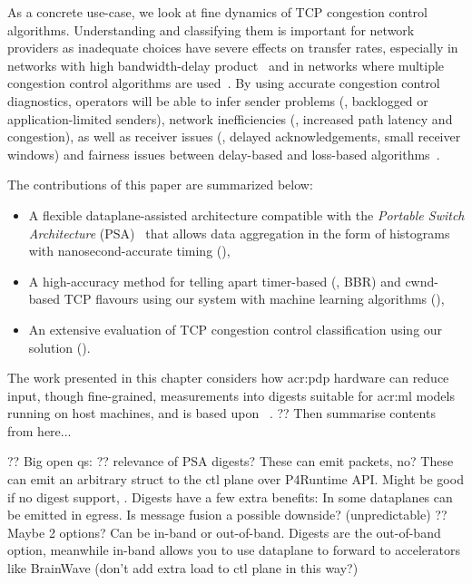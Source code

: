 As a concrete use-case, we look at fine dynamics of TCP congestion control algorithms.
Understanding and classifying them is important for network providers as inadequate choices have severe effects on transfer rates, especially in networks with high bandwidth-delay product~\parencite{DBLP:journals/queue/CardwellCGYJ16} and in networks where multiple congestion control algorithms are used~\parencite{DBLP:conf/imc/WareMSS19}. 
By using accurate congestion control diagnostics, operators will be able to infer sender problems (\eg, backlogged or application-limited senders), network inefficiencies (\eg, increased path latency and congestion), as well as receiver issues (\eg, delayed acknowledgements, small receiver windows) and fairness issues between delay-based and loss-based algorithms~\parencite{DBLP:conf/imc/WareMSS19}.

The contributions of this paper are summarized below:
\begin{itemize}
	\item A flexible dataplane-assisted architecture compatible with the \emph{Portable Switch Architecture} (PSA)~\parencite{p4-psa} that allows data aggregation in the form of histograms with nanosecond-accurate timing (),
	\item A high-accuracy method for telling apart timer-based (\eg, BBR) and cwnd-based TCP flavours using our system with machine learning algorithms (),
	\item An extensive evaluation of TCP congestion control classification using our solution ().
\end{itemize}

The work presented in this chapter considers how \gls{acr:pdp} hardware can reduce input, though fine-grained, measurements into digests suitable for \gls{acr:ml} models running on host machines, and is based upon ~\parencite{DBLP:conf/globecom/SimpsonCP20}.
?? Then summarise contents from here...

?? Big open qs:
?? relevance of PSA digests? These can emit packets, no? These can emit an arbitrary struct to the ctl plane over P4Runtime API. Might be good if no digest support, . Digests have a few extra benefits: In some dataplanes can be emitted in egress. Is message fusion a possible downside? (unpredictable)
?? Maybe 2 options? Can be in-band or out-of-band. Digests are the out-of-band option, meanwhile in-band allows you to use dataplane to forward to accelerators like BrainWave (don't add extra load to ctl plane in this way?)

